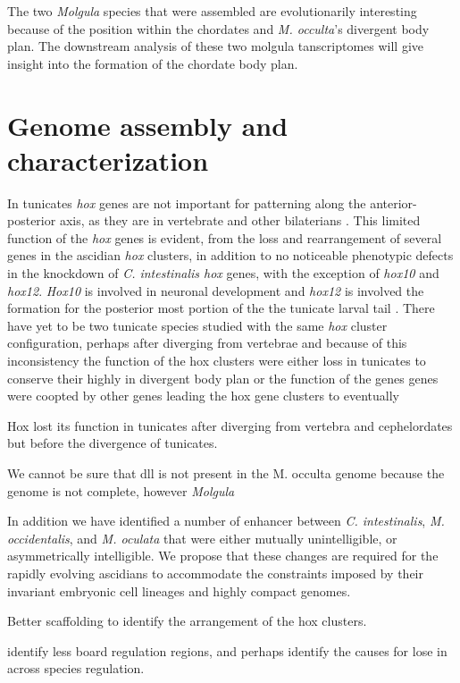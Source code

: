 The two \textit{Molgula} species that were assembled are evolutionarily interesting because of the position within the chordates and \textit{M. occulta}'s divergent body plan. The downstream analysis of these two molgula tanscriptomes will give insight into the formation of the chordate body plan. 

\section{Genome assembly and characterization}
In tunicates \textit{hox} genes are not important for patterning along the anterior-posterior axis, as they are in vertebrate and other bilaterians \cite{finnerty_origins_2003,mallo_regulation_2013,ikuta_limited_2010}. This limited function of the \textit{hox} genes is evident, from the loss and rearrangement of several genes in the ascidian \textit{hox} clusters, in addition to no noticeable phenotypic defects in the knockdown of \textit{C. intestinalis hox} genes, with the exception of \textit{hox10} and \textit{hox12}. \textit{Hox10} is involved in neuronal development and \textit{hox12} is involved the formation for the posterior most portion of the the tunicate larval tail \cite{ikuta_limited_2010}. There have yet to be two tunicate species studied with the same \textit{hox} cluster configuration, perhaps after diverging from vertebrae and because of this inconsistency the function of the hox clusters were either loss in tunicates to conserve their highly in divergent body plan or the function of the genes genes were coopted by other genes leading the hox gene clusters to eventually 

Hox lost its function in tunicates after diverging from vertebra and cephelordates but before the divergence of tunicates. 

We cannot be sure that dll is not present in the M. occulta genome because the genome is not complete, however  \textit{Molgula}

In addition we have identified a number of enhancer between \textit{C. intestinalis}, \textit{M. occidentalis}, and \textit{M. oculata} that were either mutually unintelligible, or asymmetrically intelligible. We propose that these changes are required for the rapidly evolving ascidians to accommodate the constraints imposed by their invariant embryonic cell lineages and highly compact genomes.

Better scaffolding to identify the arrangement of the hox clusters. 

identify less board regulation regions, and perhaps identify the causes for lose in across species regulation.

